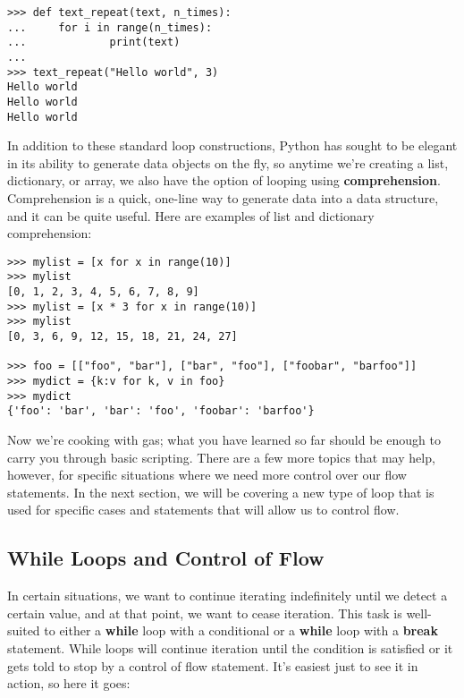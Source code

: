 \documentclass[a4paper,11pt]{article}
\begin{document}
\vspace{3mm}
\begin{lstlisting}
>>> def text_repeat(text, n_times):
...     for i in range(n_times):
...             print(text)
... 
>>> text_repeat("Hello world", 3)
Hello world
Hello world
Hello world
\end{lstlisting}
\vspace{3mm}

In addition to these standard loop constructions, Python has sought to be elegant in its ability 
to generate data objects on the fly, so anytime we're creating a list, dictionary, or array, we also 
have the option of looping using \textbf{comprehension}.  Comprehension is a quick, one-line way to 
generate data into a data structure, and it can be quite useful.  Here are examples of list and 
dictionary comprehension:

\vspace{3mm}
\begin{lstlisting}
>>> mylist = [x for x in range(10)]
>>> mylist
[0, 1, 2, 3, 4, 5, 6, 7, 8, 9]
>>> mylist = [x * 3 for x in range(10)]
>>> mylist
[0, 3, 6, 9, 12, 15, 18, 21, 24, 27]

>>> foo = [["foo", "bar"], ["bar", "foo"], ["foobar", "barfoo"]]
>>> mydict = {k:v for k, v in foo}
>>> mydict
{'foo': 'bar', 'bar': 'foo', 'foobar': 'barfoo'}
\end{lstlisting}
\vspace{3mm}

Now we're cooking with gas; what you have learned so far should be enough to carry you through basic 
scripting.  There are a few more topics that may help, however, for specific situations where we 
need more control over our flow statements.  In the next section, we will be covering a new type 
of loop that is used for specific cases and statements that will allow us to control flow.

\pagebreak
\subsection{While Loops and Control of Flow}
In certain situations, we want to continue iterating indefinitely until we detect a certain value, 
and at that point, we want to cease iteration.  This task is well-suited to either a \textbf{while} 
loop with a conditional or a \textbf{while} loop with a \textbf{break} statement.  While loops will 
continue iteration until the condition is satisfied or it gets told to stop by a control of flow 
statement.  It's easiest just to see it in action, so here it goes:
\end{document}
